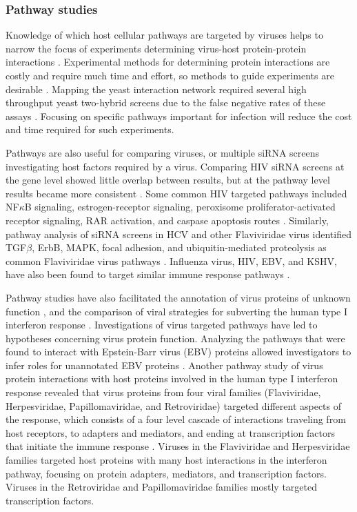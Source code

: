 \subsubsection{Pathway studies}

Knowledge of which host cellular pathways are targeted by viruses
helps to narrow the focus of experiments determining virus-host
protein-protein interactions \cite{lee2004probabilistic}. Experimental
methods for determining protein interactions are costly and require
much time and effort, so methods to guide experiments are desirable
\cite{skrabanek2008computational}. Mapping the yeast interaction
network required several high throughput yeast two-hybrid screens due
to the false negative rates of these assays
\cite{collins2007toward,huang2009precision}. Focusing on specific
pathways important for infection will reduce the cost and time
required for such experiments.

Pathways are also useful for comparing viruses, or multiple siRNA
screens investigating host factors required by a virus. Comparing HIV
siRNA screens at the gene level showed little overlap between results,
but at the pathway level results became more consistent
\cite{yeung09}. Some common HIV targeted pathways included NF$\kappa$B
signaling, estrogen-receptor signaling, peroxisome
proliferator-activated receptor signaling, RAR activation, and caspase
apoptosis routes \cite{yeung09}. Similarly, pathway analysis of siRNA
screens in HCV and other Flaviviridae virus identified TGF$\beta$,
ErbB, MAPK, focal adhesion, and ubiquitin-mediated proteolysis as
common Flaviviridae virus pathways \cite{Li09}. Influenza virus, HIV,
EBV, and KSHV, have also been found to target similar immune response
pathways \cite{shapira2009physical,brander2000modulation}.

Pathway studies have also facilitated the annotation of virus proteins
of unknown function \cite{calderwood07}, and the comparison of viral
strategies for subverting the human type I interferon response
\cite{navratil-system}. Investigations of virus targeted pathways have
led to hypotheses concerning virus protein function. Analyzing the
pathways that were found to interact with Epstein-Barr virus (EBV)
proteins allowed investigators to infer roles for unannotated EBV
proteins \cite{calderwood07}. Another pathway study of virus protein
interactions with host proteins involved in the human type I
interferon response revealed that virus proteins from four viral
families (Flaviviridae, Herpesviridae, Papillomaviridae, and
Retroviridae) targeted different aspects of the response, which
consists of a four level cascade of interactions traveling from host
receptors, to adapters and mediators, and ending at transcription
factors that initiate the immune response
\cite{navratil-system}. Viruses in the Flaviviridae and Herpesviridae
families targeted host proteins with many host interactions in the
interferon pathway, focusing on protein adapters, mediators, and
transcription factors. Viruses in the Retroviridae and
Papillomaviridae families mostly targeted transcription factors.

